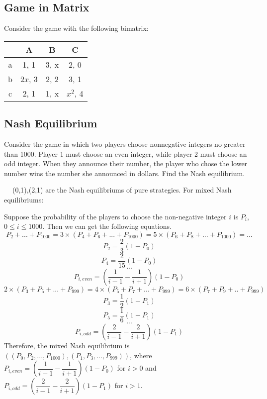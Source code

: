 \documentclass[11pt, answers]{exam}
\begin{document}
%
%
\begin{questions}
\section{Game in Matrix}
\question
Consider the game with the following bimatrix:
\begin{table}[htbp]
  \centering
    \begin{tabular}{|c|c|c|c|}
    \hline
          & A     & B     & C \\
    \hline
    a     & 1, 1  & 3, x  & 2, 0 \\
    \hline
    b     & $2x$, 3 & 2, 2  & 3, 1 \\
    \hline
    c     & 2, 1  & 1, x  & $x^2$, 4 \\
    \hline
    \end{tabular}
\end{table}
\end{questions}

%
%
\begin{questions}
\section{Nash Equilibrium}
\question
Consider the game in which two players choose nonnegative integers no greater than 1000. Player 1 must choose an even integer, while player 2 must choose an odd integer. When they announce their number, the player who chose the lower number wins the number she announced in dollars. Find the Nash equilibrium.
\par $\ \ \ \ $
(0,1),(2,1) are the Nash equilibriums of pure strategies. For mixed Nash equilibriums:
\par Suppose the probability of the players to choose the non-negative integer $i$ is $P_i$, $0\leq i\leq1000$. Then we can get the following equations.
$$P_2+...+P_{1000}=3\times(P_4+P_6+...+P_{1000})=5\times(P_6+P_8+...+P_{1000})=...$$
$$P_2=\dfrac{2}{3}(1-P_0)$$
$$P_4=\dfrac{2}{15}(1-P_0)$$
$$...$$
$$P_{i,even}=(\dfrac{1}{i-1}-\dfrac{1}{i+1})(1-P_0)$$
$$2\times(P_3+P_5+...+P_{999})=4\times(P_5+P_7+...+P_{999})=6\times(P_7+P_9+..+P_{999})$$
$$P_3=\dfrac{1}{2}(1-P_1)$$
$$P_5=\dfrac{1}{6}(1-P_1)$$
$$...$$
$$P_{i,odd}=(\dfrac{2}{i-1}-\dfrac{2}{i+1})(1-P_1)$$
Therefore, the mixed Nash equilibrium is $((P_0,P_2,...,P_{1000}),(P_1,P_3,...,P_{999}))$, where $P_{i,even}=(\dfrac{1}{i-1}-\dfrac{1}{i+1})(1-P_0)$ for $i>0$ and $P_{i,odd}=(\dfrac{2}{i-1}-\dfrac{2}{i+1})(1-P_1)$ for $i>1$.
\end{questions}
\end{document}

